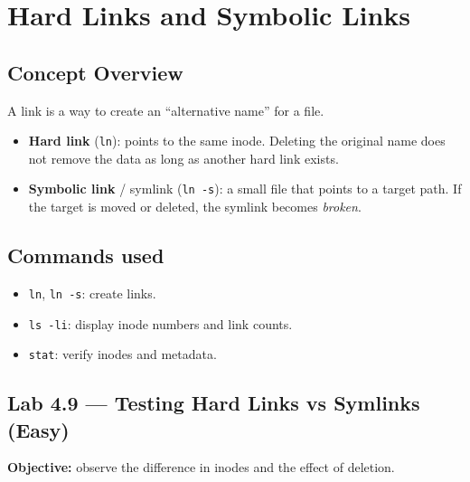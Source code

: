 \section{Hard Links and Symbolic Links}
\label{sec:links}

\subsection*{Concept Overview}
A link is a way to create an ``alternative name'' for a file.
\begin{itemize}
    \item \textbf{Hard link} (\texttt{ln}): points to the same inode. Deleting the original name does not remove the data as long as another hard link exists.
    \item \textbf{Symbolic link} / symlink (\texttt{ln -s}): a small file that points to a target path. If the target is moved or deleted, the symlink becomes \textit{broken}.
\end{itemize}

\subsection*{Commands used}
\begin{itemize}
    \item \texttt{ln}, \texttt{ln -s}: create links.
    \item \texttt{ls -li}: display inode numbers and link counts.
    \item \texttt{stat}: verify inodes and metadata.
\end{itemize}

\subsection*{Lab 4.9 --- Testing Hard Links vs Symlinks (Easy)}
\textbf{Objective:} observe the difference in inodes and the effect of deletion.

